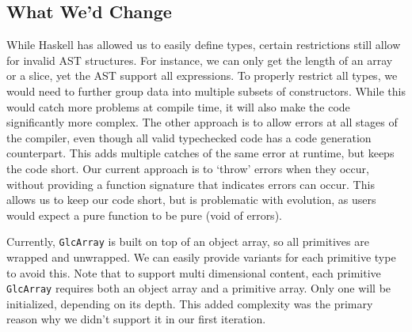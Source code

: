 \documentclass[11pt]{article}
\begin{document}
\subsection{What We'd Change}

While Haskell has allowed us to easily define types, certain
restrictions still allow for invalid AST structures.  For instance, we
can only get the length of an array or a slice, yet the AST support
all expressions.  To properly restrict all types, we would need to
further group data into multiple subsets of
constructors\cite{so:pattern/matching/subset}.  While this would catch
more problems at compile time, it will also make the code
significantly more complex.  The other approach is to allow errors at
all stages of the compiler, even though all valid typechecked code has
a code generation counterpart.  This adds multiple catches of the same
error at runtime, but keeps the code short.  Our current approach is
to `throw' errors when they occur, without providing a function
signature that indicates errors can occur.  This allows us to keep our
code short, but is problematic with evolution, as users would expect a
pure function to be pure (void of errors).

Currently, \texttt{GlcArray} is built on top of an object array, so
all primitives are wrapped and unwrapped.  We can easily provide
variants for each primitive type to avoid this.  Note that to support
multi dimensional content, each primitive \texttt{GlcArray} requires
both an object array and a primitive array. Only one will be
initialized, depending on its depth.  This added complexity was the
primary reason why we didn't support it in our first iteration.
\end{document}
